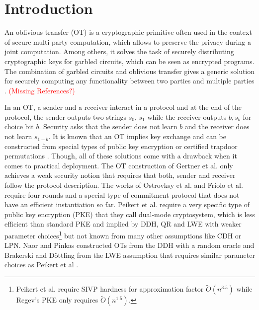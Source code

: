 \newcommand{\msng}{\textcolor{red}{(Missing References?)}}

\section{Introduction}

An oblivious transfer (OT) \cite{Rabin81,C:EveGolLem82} is a cryptographic primitive often used in the context of secure multi party computation, which allows to preserve the privacy during a joint computation. Among others, it solves the task of securely distributing cryptographic keys for garbled circuits, which can be seen as encrypted programs. The combination of garbled circuits and oblivious transfer gives a generic solution for securely computing any functionality between two parties \cite{FOCS:Yao82b,FOCS:Yao86,STOC:Kilian88,C:IshPraSah08} and multiple parties \cite{C:CreVanTap95,EC:BenLin18,EC:GarSri18a}. \msng  

In an OT, a sender and a receiver interact in a protocol and at the end of the protocol, the sender outputs two strings $s_0$, $s_1$ while the receiver outputs $b, s_b$ for choice bit $b$. Security asks that the sender does not learn $b$ and the receiver does not learn $s_{1-b}$. It is known that an OT implies key exchange and can be constructed from special types of public key encryption \cite{FOCS:GKMRV00,C:PeiVaiWat08,cryptoeprint:2018:473} or certified trapdoor permutations \cite{C:OstRicSca15}. Though, all of these solutions come with a drawback when it comes to practical deployment. The OT construction of Gertner et al. \cite{FOCS:GKMRV00} only achieves a weak security notion that requires that both, sender and receiver follow the protocol description. The works of Ostrovksy et al. \cite{C:OstRicSca15} and Friolo et al. \cite{cryptoeprint:2018:473} require four rounds and a special type of commitment protocol \cite{STOC:Kilian92,C:OstRicSca15} that does not have an efficient instantiation so far. Peikert et al. \cite{C:PeiVaiWat08} require a very specific type of public key encryption (PKE) that they call dual-mode cryptosystem, which is less efficient than standard PKE and implied by DDH, QR and LWE with weaker parameter choices\footnote{Peikert et al. require SIVP hardness for approximation factor $\tilde{O}(n^{3.5})$ while Regev's PKE \cite{STOC:Regev05} only requires $\tilde{O}(n^{1.5})$.} but not known from many other assumptions like CDH or LPN. Naor and Pinkas \cite{SODA:NaoPin01} constructed OTs from the DDH with a random oracle and Brakerski and D\"ottling \cite{TCC:BraDot18} from the LWE assumption that requires similar parameter choices as Peikert et al \cite{C:PeiVaiWat08}.

